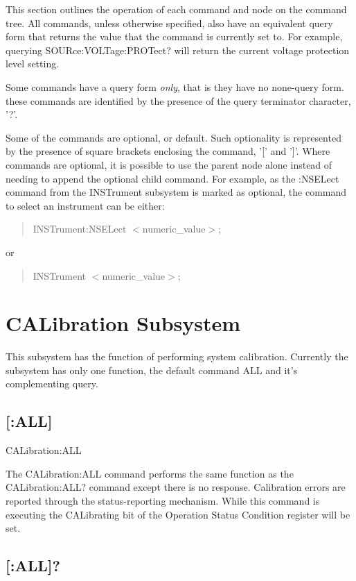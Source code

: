 This section outlines the operation of each command and node on the command tree. All commands, unless otherwise specified, also have an equivalent query form that returns the value that the command is currently set to. For example, querying S\-O\-U\-Rce\-:\-V\-O\-L\-Tage\-:P\-R\-O\-Tect? will return the current voltage protection level setting.

Some commands have a query form {\itshape only}, that is they have no none-\/query form. these commands are identified by the presence of the query terminator character, '?'.

Some of the commands are optional, or default. Such optionality is represented by the presence of square brackets enclosing the command, '\mbox{[}' and '\mbox{]}'. Where commands are optional, it is possible to use the parent node alone instead of needing to append the optional child command. For example, as the \-:N\-S\-E\-Lect command from the I\-N\-S\-Trument subsystem is marked as optional, the command to select an instrument can be either\-: \begin{quotation}
{\ttfamily I\-N\-S\-Trument\-:N\-S\-E\-Lect {\ttfamily $<$}numeric\-\_\-value{\ttfamily $>$};}

\end{quotation}
or \begin{quotation}
{\ttfamily I\-N\-S\-Trument {\ttfamily $<$}numeric\-\_\-value{\ttfamily $>$};}

\end{quotation}
\hypertarget{a00002_cal}{}\section{C\-A\-Libration Subsystem}\label{a00002_cal}
This subsystem has the function of performing system calibration. Currently the subsystem has only one function, the default command A\-L\-L and it's complementing query.\hypertarget{a00002_calall}{}\subsection{\mbox{[}\-:\-A\-L\-L\mbox{]}}\label{a00002_calall}
{\ttfamily C\-A\-Libration\-:A\-L\-L}\par
 The C\-A\-Libration\-:A\-L\-L command performs the same function as the C\-A\-Libration\-:A\-L\-L? command except there is no response. Calibration errors are reported through the status-\/reporting mechanism. While this command is executing the C\-A\-Librating bit of the Operation Status Condition register will be set.\hypertarget{a00002_callallq}{}\subsection{\mbox{[}\-:\-A\-L\-L\mbox{]}?}\label{a00002_callallq}
